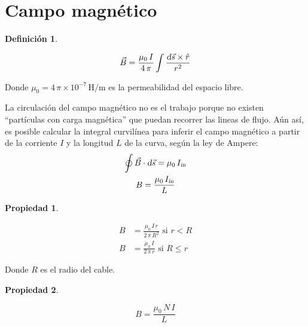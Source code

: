 \documentclass[a5paper,12pt,twoside]{book}
\newtheorem{defn}{{Definición}}[chapter]
\newtheorem{prop}{{Propiedad}}[chapter]
\begin{document}
\section{Campo magnético}

\begin{mdframed}[style=MyFrame1]
    \begin{defn}
    \end{defn}
    \begin{equation*}
        \Vec{B} = \frac{\mu_0 \, I}{4 \, \pi} \int \frac{\textsl{d} \Vec{s} \times \hat{r}}{r^2}
    \end{equation*}
\end{mdframed}

Donde $\mu_0 = 4 \, \pi \times 10^{-7} \, \si{\henry\per\metre}$ es la permeabilidad del espacio libre.

La circulación del campo magnético no es el trabajo porque no existen ``partículas con carga magnética'' que puedan recorrer las lineas de flujo. Aún así, es posible calcular la integral curvilínea para inferir el campo magnético a partir de la corriente $I$ y la longitud $L$ de la curva, según la ley de Ampere:
\begin{gather*}
    \oint \Vec{B} \cdot \textsl{d} \Vec{s} = \mu_0 \, {{I}_\textsl{{in}}}
    \\
    B = \frac{\mu_0 \, {{I}_\textsl{{in}}}}{L}
\end{gather*}

\begin{mdframed}[style=MyFrame1]
    \begin{prop}
    \end{prop}
    \begin{align*}
        B &= \frac{\mu_0 \, I \, r}{2 \, \pi \, R^2} \text{ si } r < R
        \\
        B &= \frac{\mu_0 \, I}{2 \, \pi \, r} \text{ si } R \leq r
    \end{align*}
\end{mdframed}

Donde $R$ es el radio del cable.

\begin{mdframed}[style=MyFrame1]
    \begin{prop}
    \end{prop}
    \begin{equation*}
        B = \frac{\mu_0 \, N \, I}{L}
    \end{equation*}
\end{mdframed}
\end{document}
